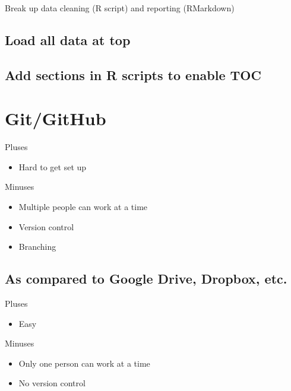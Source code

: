 \documentclass[]{book}
\providecommand{\tightlist}{%
  \setlength{\itemsep}{0pt}\setlength{\parskip}{0pt}}
\begin{document}
Break up data cleaning (R script) and reporting (RMarkdown)

\hypertarget{load-all-data-at-top}{%
\subsection{Load all data at top}\label{load-all-data-at-top}}

\hypertarget{add-sections-in-r-scripts-to-enable-toc}{%
\subsection{Add sections in R scripts to enable TOC}\label{add-sections-in-r-scripts-to-enable-toc}}

\hypertarget{gitgithub}{%
\section{Git/GitHub}\label{gitgithub}}

Pluses

\begin{itemize}
\tightlist
\item
  Hard to get set up
\end{itemize}

Minuses

\begin{itemize}
\tightlist
\item
  Multiple people can work at a time
\item
  Version control
\item
  Branching
\end{itemize}

\hypertarget{as-compared-to-google-drive-dropbox-etc.}{%
\subsection{As compared to Google Drive, Dropbox, etc.}\label{as-compared-to-google-drive-dropbox-etc.}}

Pluses

\begin{itemize}
\tightlist
\item
  Easy
\end{itemize}

Minuses

\begin{itemize}
\tightlist
\item
  Only one person can work at a time
\item
  No version control
\end{itemize}
\end{document}
